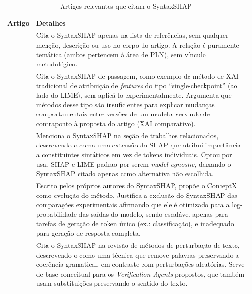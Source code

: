 \begin{table}[H]
    \centering
    \small
    \caption{Artigos relevantes que citam o SyntaxSHAP}
    \begin{tabularx}{\linewidth}{p{6cm} X}
        \toprule
        \textbf{Artigo} & \textbf{Detalhes} \\
        \midrule

        \textcite{li2026moeflowmatching} & Cita o SyntaxSHAP apenas na lista de referências, sem qualquer menção, descrição ou uso no corpo do artigo. A relação é puramente temática (ambos pertencem à área de PLN), sem vínculo metodológico. \\

        \textcite{ciaperoni2026comparing} & Cita o SyntaxSHAP de passagem, como exemplo de método de XAI tradicional de atribuição de \textit{features} do tipo ``single-checkpoint'' (ao lado do LIME), sem aplicá-lo experimentalmente. Argumenta que métodos desse tipo são insuficientes para explicar mudanças comportamentais entre versões de um modelo, servindo de contraponto à proposta do artigo (XAI comparativo). \\

        \textcite{mohammadi2025tokenreplacement} & Menciona o SyntaxSHAP na seção de trabalhos relacionados, descrevendo-o como uma extensão do SHAP que atribui importância a constituintes sintáticos em vez de tokens individuais. Optou por usar SHAP e LIME padrão por serem \textit{model-agnostic}, deixando o SyntaxSHAP citado apenas como alternativa não escolhida. \\

        \textcite{amara2025conceptlevel} & Escrito pelos próprios autores do SyntaxSHAP, propõe o ConceptX como evolução do método. Justifica a exclusão do SyntaxSHAP das comparações experimentais afirmando que ele é otimizado para a log-probabilidade das saídas do modelo, sendo escalável apenas para tarefas de geração de token único (ex.: classificação), e inadequado para geração de resposta completa. \\

        \textcite{yan2025explainablemapper} & Cita o SyntaxSHAP na revisão de métodos de perturbação de texto, descrevendo-o como uma técnica que remove palavras preservando a coerência gramatical, em contraste com perturbações aleatórias. Serve de base conceitual para os \textit{Verification Agents} propostos, que também usam substituições preservando o sentido do texto. \\

        \bottomrule
    \end{tabularx}
    \label{tab:syntaxshap-citacoes}
\end{table}


